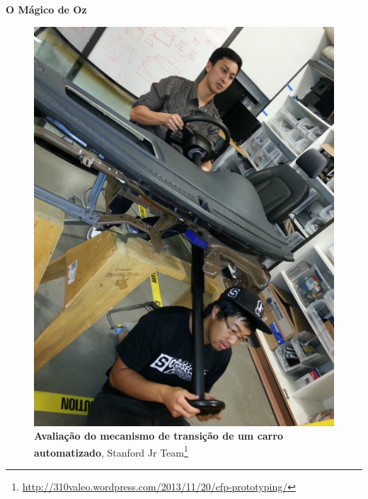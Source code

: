 \expandafter\documentclass\expandafter[table, usenames, svgnames, dvipsnames, \classopts]{beamer}
\begin{document}
\begin{frame}{\textbf{O Mágico de Oz}}

	\begin{figure}
	    \centering
        \includegraphics[draft,height=0.7\paperheight]{wizard-of-oz}
        \caption{\textbf{Avaliação do mecanismo de transição de um carro automatizado}, Stanford Jr Team\footnote{\url{http://310valeo.wordpress.com/2013/11/20/cfp-prototyping/}}}
    \end{figure}

\end{frame}
\end{document}
